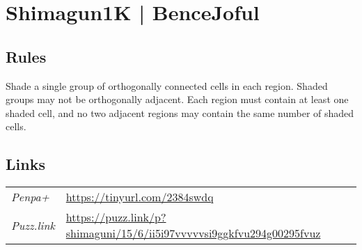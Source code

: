 \section{Shimagun1K | {\normalfont BenceJoful}}
\label{sec:49-shimagun1k-bencejoful}

\subsection*{Rules}
\begin{markdown}
Shade a single group of orthogonally connected cells in each region. Shaded groups may not be orthogonally adjacent. Each region must contain at least one shaded cell, and no two adjacent regions may contain the same number of shaded cells.
\end{markdown}
\subsection*{Links}
\begin{tabularx}{\textwidth}{l X}
\emph{Penpa+} & \url{https://tinyurl.com/2384swdq } \\
\emph{Puzz.link} & \url{https://puzz.link/p?shimaguni/15/6/ii5i97vvvvvsi9ggkfvu294g00295fvuz} \\
\end{tabularx}
\pagebreak
